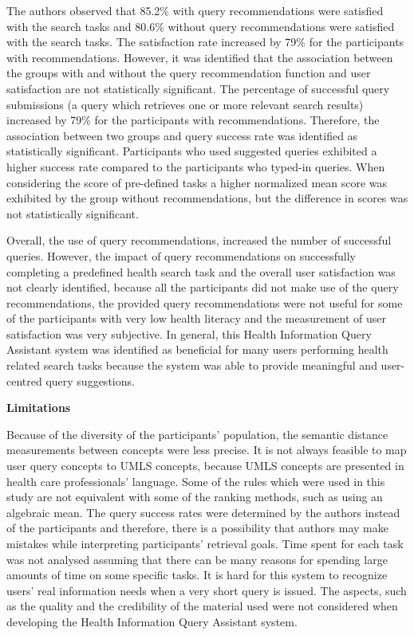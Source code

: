 \documentclass[]{article}
\begin{document}
The authors observed that 85.2\% with query recommendations were satisfied with the search tasks and 80.6\% without query recommendations were satisfied with the search tasks. The satisfaction rate increased by 79\% for the participants with recommendations. However, it was identified that the association between the groups with and without the query recommendation function and user satisfaction are not statistically significant. The percentage of successful query submissions (a query which retrieves one or more relevant search results) increased by 79\% for the participants with recommendations. Therefore, the association between two groups and query success rate was identified as statistically significant. Participants who used suggested queries exhibited a higher success rate compared to the participants who typed-in queries. When considering the score of pre-defined tasks a higher normalized mean score was exhibited by the group without recommendations, but the difference in scores was not statistically significant.                     

Overall, the use of query recommendations, increased the number of successful queries. However, the impact of query recommendations on successfully completing a predefined health search task and the overall user satisfaction was not clearly identified, because all the participants did not make use of the query recommendations, the provided query recommendations were not useful for some of the participants with very low health literacy and the measurement of user satisfaction was very subjective. In general, this Health Information Query Assistant system was identified as beneficial for many users performing health related search tasks because the system was able to provide meaningful and user-centred query suggestions.

\textbf{Limitations}

Because of the diversity of the participants' population, the semantic distance measurements between concepts were less precise. It is not always feasible to map user query concepts to UMLS concepts, because UMLS concepts are presented in health care professionals’ language. Some of the rules which were used in this study are not equivalent with some of the ranking methods, such as using an algebraic mean. The query success rates were determined by the authors instead of the participants and therefore, there is a possibility that authors may make mistakes while interpreting participants' retrieval goals. Time spent for each task was not analysed assuming that there can be many reasons for spending large amounts of time on some specific tasks. It is hard for this system to recognize users' real information needs when a very short query is issued. The aspects, such as the quality and the credibility of the material used were not considered when developing the Health Information Query Assistant system.
\end{document}
